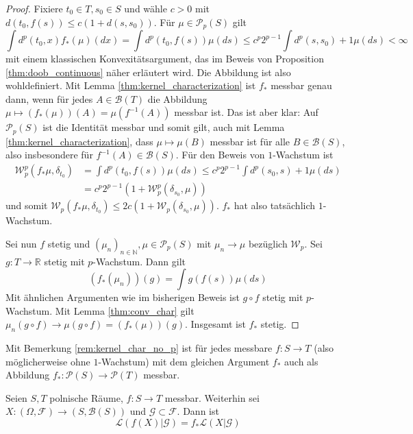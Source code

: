\begin{proof}
Fixiere $t_0 \in T, s_0 \in S$ und wähle $c>0$ mit $d(t_0, f(s)) \leq c(1+ d(s, s_0))$. Für $\mu \in \mathcal{P}_p(S)$ gilt
$$\int d^p(t_0, x) f_*(\mu)(dx) = \int d^p(t_0, f(s))\mu(ds) \leq c^p2^{p-1} \int d^p(s,s_0) + 1 \mu(ds) < \infty$$
mit einem klassischen Konvexitätsargument, das im Beweis von Proposition \ref{thm:doob_continuous} näher erläutert wird. Die Abbildung ist also wohldefiniert.
Mit Lemma \ref{thm:kernel_characterization} ist $f_*$ messbar genau dann, wenn für jedes $A \in \mathcal{B}(T)$ die Abbildung $\mu \mapsto (f_*(\mu))(A)=\mu(f^{-1}(A))$ messbar ist. Das ist aber klar: Auf $\mathcal{P}_p(S)$ ist die Identität messbar und somit gilt, auch mit Lemma \ref{thm:kernel_characterization}, dass $\mu \mapsto \mu(B)$ messbar ist für alle $B\in \mathcal{B}(S)$, also insbesondere für $f^{-1}(A) \in \mathcal{B}(S)$. Für den Beweis von $1$-Wachstum ist 
\begin{align*}
    \mathcal{W}_p^p(f_*\mu, \delta_{t_0}) &= \int d^p(t_0, f(s))\mu(ds) \leq c^p2^{p-1} \int d^p(s_0, s) + 1\mu(ds) \\
    &= c^p2^{p-1}(1 + \mathcal{W}_p^p(\delta_{s_0}, \mu))
\end{align*}
und somit $\mathcal{W}_p(f_*\mu, \delta_{t_0}) \leq 2c(1 + \mathcal{W}_p(\delta_{s_0}, \mu))$. $f_*$ hat also tatsächlich $1$-Wachstum.

Sei nun $f$ stetig und $(\mu_n)_{n\in\mathbb{N}}, \mu \in \mathcal{P}_p(S)$ mit $\mu_n\rightarrow \mu$ bezüglich $\mathcal{W}_p$. Sei $g:T\rightarrow \mathbb{R}$ stetig mit $p$-Wachstum. Dann gilt
    $$(f_*(\mu_n))(g) = \int g(f(s)) \mu(ds)$$
Mit ähnlichen Argumenten wie im bisherigen Beweis ist $g\circ f$ stetig mit $p$-Wachstum. Mit Lemma \ref{thm:conv_char} gilt $\mu_n(g\circ f) \rightarrow \mu(g\circ f) = (f_*(\mu))(g)$. Insgesamt ist $f_*$ stetig.
\end{proof}
\begin{remark}
Mit Bemerkung \ref{rem:kernel_char_no_p} ist für jedes messbare $f: S\rightarrow T$ (also möglicherweise ohne $1$-Wachstum) mit dem gleichen Argument $f_*$ auch als Abbildung $f_*: \mathcal{P}(S) \rightarrow \mathcal{P}(T)$ messbar.
\end{remark}
\begin{lemma}\label{thm:pushforward_law}
Seien $S, T$ polnische Räume, $f:S\rightarrow T$ messbar. Weiterhin sei $X:(\Omega, \mathcal{F}) \rightarrow (S, \mathcal{B}(S))$ und $\mathcal{G}\subset\mathcal{F}$. Dann ist 
$$\mathcal{L}(f(X)\vert \mathcal{G}) = f_*\mathcal{L}(X\vert\mathcal{G})$$
\end{lemma}
